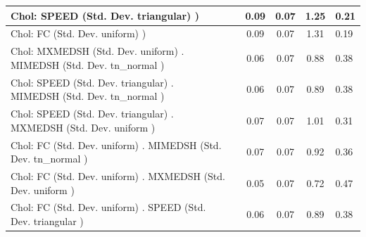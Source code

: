 \begin{table}
\begin{center}
\begin{tabular}{|l|l|c|c|c|l|}
			\hline
			 Chol: SPEED (Std. Dev. triangular) ) &  & 0.09 & 0.07 & 1.25 & 0.21 \\
			\hline
			 Chol: FC (Std. Dev. uniform) ) &  & 0.09 & 0.07 & 1.31 & 0.19 \\
			\hline
			 Chol: MXMEDSH (Std. Dev. uniform) . MIMEDSH (Std. Dev.   tn_normal ) &  & 0.06 & 0.07 & 0.88 & 0.38 \\
			\hline
			 Chol: SPEED (Std. Dev. triangular) . MIMEDSH (Std. Dev.   tn_normal ) &  & 0.06 & 0.07 & 0.89 & 0.38 \\
			\hline
			 Chol: SPEED (Std. Dev. triangular) . MXMEDSH (Std. Dev.   uniform ) &  & 0.07 & 0.07 & 1.01 & 0.31 \\
			\hline
			 Chol: FC (Std. Dev. uniform) . MIMEDSH (Std. Dev.   tn_normal ) &  & 0.07 & 0.07 & 0.92 & 0.36 \\
			\hline
			 Chol: FC (Std. Dev. uniform) . MXMEDSH (Std. Dev.   uniform ) &  & 0.05 & 0.07 & 0.72 & 0.47 \\
			\hline
			 Chol: FC (Std. Dev. uniform) . SPEED (Std. Dev.   triangular ) &  & 0.06 & 0.07 & 0.89 & 0.38 \\
			\hline
		\end{tabular}
	\end{center}
\end{table}
